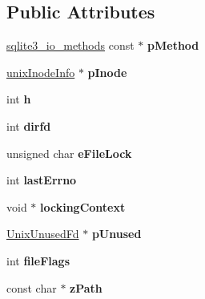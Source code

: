 \subsection*{Public Attributes}
\begin{DoxyCompactItemize}
\item 
\hypertarget{structunix_file_a2a2b40e965f91aa9ee21135bfb0c17ec}{\hyperlink{structsqlite3__io__methods}{sqlite3\-\_\-io\-\_\-methods} const $\ast$ {\bfseries p\-Method}}\label{structunix_file_a2a2b40e965f91aa9ee21135bfb0c17ec}

\item 
\hypertarget{structunix_file_ac17292fe29bb6cc9eceed9db6d1209e8}{\hyperlink{structunix_inode_info}{unix\-Inode\-Info} $\ast$ {\bfseries p\-Inode}}\label{structunix_file_ac17292fe29bb6cc9eceed9db6d1209e8}

\item 
\hypertarget{structunix_file_a1c58798d4ff3ac6232765c8b76bb7450}{int {\bfseries h}}\label{structunix_file_a1c58798d4ff3ac6232765c8b76bb7450}

\item 
\hypertarget{structunix_file_aa4d81dba57e69451d4bc2c4593faaef6}{int {\bfseries dirfd}}\label{structunix_file_aa4d81dba57e69451d4bc2c4593faaef6}

\item 
\hypertarget{structunix_file_a001e59bdb9d3f396952c2c8e3229f7fc}{unsigned char {\bfseries e\-File\-Lock}}\label{structunix_file_a001e59bdb9d3f396952c2c8e3229f7fc}

\item 
\hypertarget{structunix_file_afde57c2e118fac8041918dac2ee6f7d1}{int {\bfseries last\-Errno}}\label{structunix_file_afde57c2e118fac8041918dac2ee6f7d1}

\item 
\hypertarget{structunix_file_afaeb4425a6de3e913db4b03e8a0d098a}{void $\ast$ {\bfseries locking\-Context}}\label{structunix_file_afaeb4425a6de3e913db4b03e8a0d098a}

\item 
\hypertarget{structunix_file_a3820ccead5805d2ea61ca1c752646852}{\hyperlink{struct_unix_unused_fd}{Unix\-Unused\-Fd} $\ast$ {\bfseries p\-Unused}}\label{structunix_file_a3820ccead5805d2ea61ca1c752646852}

\item 
\hypertarget{structunix_file_a43e6df5096c2a58cb009b7c407f7cfeb}{int {\bfseries file\-Flags}}\label{structunix_file_a43e6df5096c2a58cb009b7c407f7cfeb}

\item 
\hypertarget{structunix_file_afc5eff0948d553308cf90a79d4a06f17}{const char $\ast$ {\bfseries z\-Path}}\label{structunix_file_afc5eff0948d553308cf90a79d4a06f17}


\end{DoxyCompactItemize}
